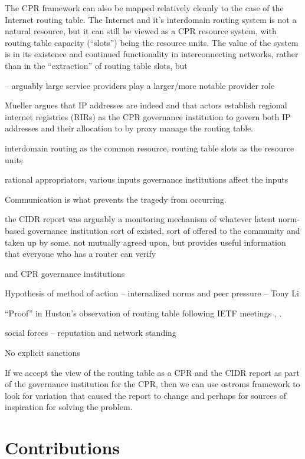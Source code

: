 The CPR framework can also be mapped relatively cleanly to the case of the Internet routing table. The Internet and it's interdomain routing system is not a natural resource, but it can still be viewed as a CPR resource system, with routing table capacity (``slots'') being the resource units. The value of the system is in its existence and continued functionality in interconnecting networks, rather than in the ``extraction'' of routing table slots, but 

-- arguably large service providers play a larger/more notable provider role

Mueller \cite{Mueller:2010bh} argues that IP addresses are indeed  and that actors establish regional internet registries (RIRs) as the CPR governance institution to govern both IP addresses and their allocation to by proxy manage the routing table.

interdomain routing as the common resource, routing table slots as the resource units

rational appropriators, various inputs
governance institutions affect the inputs

Communication is what prevents the tragedy from occurring.


the CIDR report was arguably a monitoring mechanism of whatever latent norm-based governance institution sort of existed, sort of offered to the community and taken up by some. not mutually agreed upon, but provides useful information that everyone who has a router can verify


and CPR governance institutions 


Hypothesis of method of action -- internalized norms and peer pressure -- Tony Li

``Proof'' in Huston's observation of routing table following IETF meetings \cite{Huston:2001bs}, \cite{Clayton:2010bh}.

social forces -- reputation and network standing \cite{Mathew:2010ly}

No explicit sanctions

If we accept the view of the routing table as a CPR and the CIDR report as part of the governance institution for the CPR, then we can use ostroms framework to look for variation that caused the report to change and perhaps for sources of inspiration for solving the problem.

\section{Contributions}

